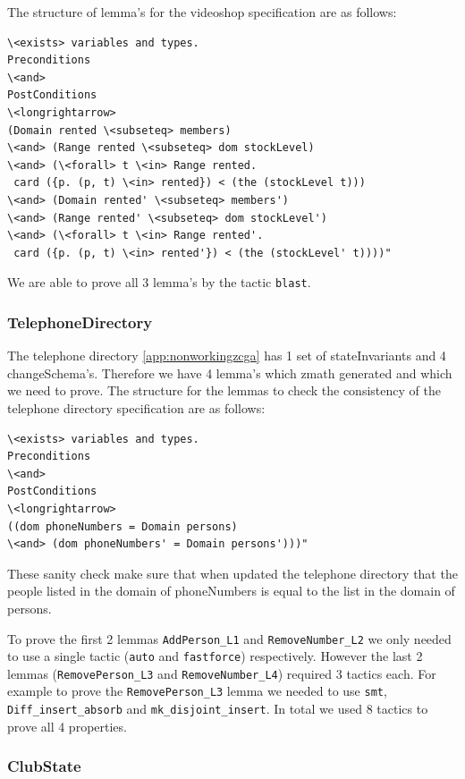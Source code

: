 The structure of lemma's for the videoshop specification are as follows:

\begin{verbatim}
\<exists> variables and types.
Preconditions
\<and>
PostConditions
\<longrightarrow>
(Domain rented \<subseteq> members)
\<and> (Range rented \<subseteq> dom stockLevel)
\<and> (\<forall> t \<in> Range rented.
 card ({p. (p, t) \<in> rented}) < (the (stockLevel t)))
\<and> (Domain rented' \<subseteq> members')
\<and> (Range rented' \<subseteq> dom stockLevel')
\<and> (\<forall> t \<in> Range rented'.
 card ({p. (p, t) \<in> rented'}) < (the (stockLevel' t))))"
\end{verbatim}

We are able to prove all 3 lemma's by the tactic \verb|blast|. 

\subsubsection{TelephoneDirectory}

The telephone directory \ref{app:nonworkingzcga} has 1 set of stateInvariants and 4 changeSchema's.
Therefore we have 4 lemma's which \gls{zmath} generated and which we need to
prove. The structure for the lemmas to check the consistency of the telephone
directory specification are as follows:

\begin{verbatim}
\<exists> variables and types.
Preconditions
\<and>
PostConditions
\<longrightarrow>
((dom phoneNumbers = Domain persons)
\<and> (dom phoneNumbers' = Domain persons')))"
\end{verbatim}

These sanity check make sure that when updated the telephone directory that the
people listed in the domain of phoneNumbers is equal to the list in the domain
of persons.

To prove the first 2 lemmas \verb|AddPerson_L1| and \verb|RemoveNumber_L2| we
only needed to use a single tactic (\verb|auto| and \verb|fastforce|)
respectively. However the last 2 lemmas (\verb|RemovePerson_L3| and
\verb|RemoveNumber_L4|) required 3 tactics each. For example to prove the
\verb|RemovePerson_L3| lemma we needed to use \verb|smt|,
\verb|Diff_insert_absorb| and \verb|mk_disjoint_insert|. In total we used 8
tactics to prove all 4 properties.

\subsubsection{ClubState}

